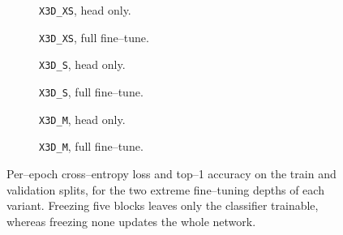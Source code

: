\begin{figure}[H]
    \centering
    \begin{subfigure}[b]{0.49\textwidth}
        \caption{\texttt{X3D\_XS}, head only.}
    \end{subfigure}
    \hfill
    \begin{subfigure}[b]{0.49\textwidth}
        \caption{\texttt{X3D\_XS}, full fine--tune.}
    \end{subfigure}

    \vspace{0.4em}

    \begin{subfigure}[b]{0.49\textwidth}
        \caption{\texttt{X3D\_S}, head only.}
    \end{subfigure}
    \hfill
    \begin{subfigure}[b]{0.49\textwidth}
        \caption{\texttt{X3D\_S}, full fine--tune.}
    \end{subfigure}

    \vspace{0.4em}

    \begin{subfigure}[b]{0.49\textwidth}
        \caption{\texttt{X3D\_M}, head only.}
    \end{subfigure}
    \hfill
    \begin{subfigure}[b]{0.49\textwidth}
        \caption{\texttt{X3D\_M}, full fine--tune.}
    \end{subfigure}
    \caption{Per--epoch cross--entropy loss and top--1 accuracy on the train and validation splits, for the two extreme fine--tuning depths of each variant. Freezing five blocks leaves only the classifier trainable, whereas freezing none updates the whole network.}
    \label{fig:curves}
\end{figure}

